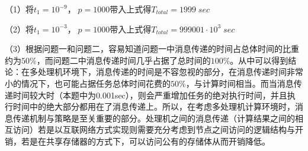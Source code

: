 \documentclass[12pt]{article}
\begin{document}
	（1）将$t_1=10^{-9}，\;p=1000$带入上式得$T_{total}=1999\;sec$
	
	（2）将$t_1=10^{-3}，\;p=1000$带入上式得$T_{total}=999001\cdot10^{3}\;sec$
	
	（3）根据问题一和问题二，容易知道问题一中消息传递的时间占总体时间的比重约为$
	50\%$，而问题二中消息传递时间几乎占据了总时间的$100\%$。从中可以得到结论：在多处理机环境下，消息传递的时间是不容忽视的部分，在消息传递时间非常小的情况下，也可能占据任务总体时间花费的$50\%$，与计算时间相当。而当消息传递时间较大时（本题中为0.001sec），则会严重增加任务的绝对执行时间，并且执行时间中的绝大部分都用在了消息传递上。所以，在考虑多处理机计算环境时，消息传递机制与策略是至关重要的部分。处理机之间的消息传递（计算结果之间的相互访问）若是以互联网络方式实现则需要充分考虑到节点之间访问的逻辑结构与开销，若是在共享存储器的方式下，可以访问公有的存储体从而开销降低。
\end{document}
